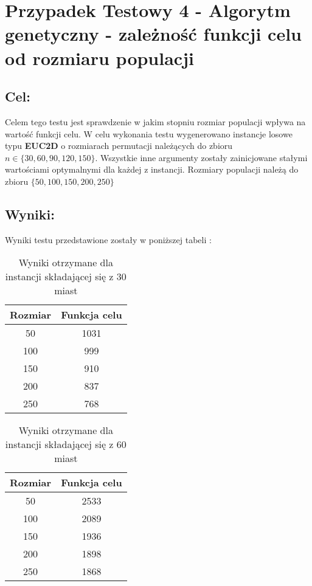 \section{Przypadek Testowy 4 - Algorytm genetyczny - zależność funkcji celu od rozmiaru populacji}
  \subsection{Cel:}
    Celem tego testu jest sprawdzenie w jakim stopniu rozmiar populacji wpływa na wartość funkcji celu. 
    W celu wykonania testu wygenerowano instancje losowe typu \textbf{EUC2D} o rozmiarach permutacji należących do zbioru $n \in \{30,60,90,120,150\}$.
    Wszystkie inne argumenty zostały zainicjowane stałymi wartościami optymalnymi dla każdej z instancji. Rozmiary populacji należą do zbioru $ \{50,100,150,200,250\} $
  \subsection{Wyniki: }
    Wyniki testu przedstawione zostały w poniższej tabeli :
    \begin{table}[!ht]
        \centering
        \begin{tabular}{|c | c |}
        \hline
            Rozmiar & Funkcja celu \\ \hline
            50 & 1031\\ \hline
            100 & 999\\ \hline
            150 & 910\\ \hline
            200 & 837 \\ \hline
            250 & 768\\ \hline
        \end{tabular}
        \caption{Wyniki otrzymane dla instancji składającej się z 30 miast}
    
      \end{table}
      \begin{table}[!ht]
        \centering
        \begin{tabular}{| c | c |}
        \hline
            Rozmiar & Funkcja celu  \\ \hline
            50 & 2533\\ \hline
            100 & 2089\\ \hline
            150 & 1936\\ \hline
            200 & 1898\\ \hline
            250 & 1868\\ \hline
            
        \end{tabular}
        \caption{Wyniki otrzymane dla instancji składającej się z 60 miast}
    
      \end{table}
